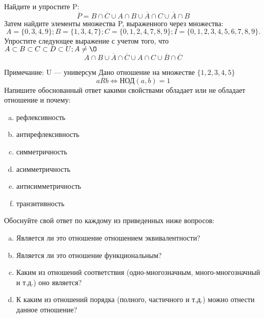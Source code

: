 \documentclass[10pt]{exam}
\begin{document}
\begin{questions}
\question
Найдите и упростите P:
\begin{equation*}
\overline{P} = B \cap \overline{C} \cup A \cap B \cup \overline{A} \cap C \cup \overline{A} \cap B
\end{equation*}
Затем найдите элементы множества P, выраженного через множества:
\begin{equation*}
A = \{0, 3, 4, 9\}; 
B = \{1, 3, 4, 7\};
C = \{0, 1, 2, 4, 7, 8, 9\};
I = \{0, 1, 2, 3, 4, 5, 6, 7, 8, 9\}.
\end{equation*}\question
Упростите следующее выражение с учетом того, что $A\subset B \subset C \subset D \subset U; A \neq \O$
\begin{equation*}
A \cap B \cup \overline{A} \cap \overline{C} \cup A \cap C \cup \overline{B} \cap \overline{C}
\end{equation*}

Примечание: U — универсум\question
Дано отношение на множестве $\{1, 2, 3, 4, 5\}$ 
\begin{equation*}
aRb \iff  \text{НОД}(a,b) =1
\end{equation*}
Напишите обоснованный ответ какими свойствами обладает или не обладает отношение и почему:   
\begin{enumerate} [a)]\setcounter{enumi}{0}
\item рефлексивность
\item антирефлексивность
\item симметричность
\item асимметричность
\item антисимметричность
\item транзитивность
\end{enumerate}

Обоснуйте свой ответ по каждому из приведенных ниже вопросов:
\begin{enumerate} [a)]\setcounter{enumi}{0}
    \item Является ли это отношение отношением эквивалентности?
    \item Является ли это отношение функциональным?
    \item Каким из отношений соответствия (одно-многозначным, много-многозначный и т.д.) оно является?
    \item К каким из отношений порядка (полного, частичного и т.д.) можно отнести данное отношение?
\end{enumerate}



\end{questions}
\end{document}

